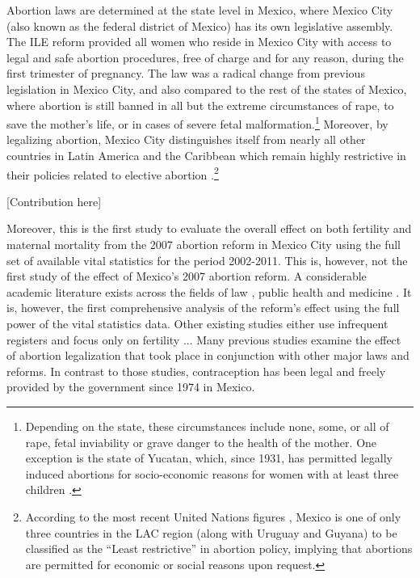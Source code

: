 \documentclass[a4paper,11pt]{article}
\begin{document}
\begin{spacing}{1.5}
Abortion laws are determined at the state level in Mexico, where Mexico City (also known as the federal district of Mexico) has its own legislative assembly.  The ILE reform provided all women who reside in Mexico City with access to legal and safe abortion procedures, free of charge and for any reason, during the first trimester of pregnancy. The law was a radical change from previous legislation in Mexico City, and also compared to the rest of the states of Mexico, where abortion is still banned in all but the extreme circumstances of rape, to save the mother's life, or in cases of severe fetal malformation.\footnote{Depending on the state, these circumstances include none, some, or all of rape, fetal inviability or grave danger to the health of the mother. One exception is the state of Yucatan, which, since 1931, has permitted legally induced abortions for socio-economic reasons for women with at least three children \citep{GIRE2009}.} Moreover, by legalizing abortion, Mexico City distinguishes itself from nearly all other countries in Latin America and the Caribbean which remain highly restrictive in their policies related to elective abortion \citep{Fraser2015}.\footnote{According to the most recent United Nations figures \citep{UN2014}, Mexico is one of only three countries in the LAC region (along with Uruguay and Guyana) to be classified as the ``Least restrictive'' in abortion policy, implying that abortions are permitted for economic or social reasons upon request.}


 [Contribution here]

  Moreover, this is the first study to evaluate the overall effect on both fertility and maternal mortality from the 2007 abortion reform in Mexico City using the full set of available vital statistics for the period 2002-2011. This is, however, not the first study of the effect of Mexico's 2007 abortion reform.  A considerable academic literature exists across the fields of law \citep{Johnson2013}, public health \citep{Contreras2011,Schiavonetal2010,Becker2013,Kalb} and medicine \citep{Madrazo2009}.  It is, however, the first comprehensive analysis of the reform's effect using the full power of the vital statistics data.  Other existing studies either use infrequent registers and focus only on fertility \citep{Gutierrez2015}...  Many previous studies examine the effect of abortion legalization that took place in conjunction with other major laws and reforms. In contrast to those studies, contraception has been legal and freely provided by the government since 1974 in Mexico.


\end{spacing}
\end{document}
